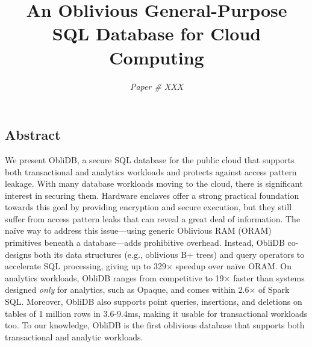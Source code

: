 \documentclass[letterpaper,twocolumn,10pt]{article}
\newcommand{\ignore}[1]{}
\def\name/{ObliDB}
\begin{document}
\date{\vspace{-0.9cm}}

\setlength{\droptitle}{-1.1cm}

\title{\Large \bf An Oblivious General-Purpose SQL Database for Cloud Computing\vspace{-0.1cm}}

\author{\emph{Paper \# XXX}}

\ignore{
\author{
{\rm Your N.\ Here}\\
Your Institution
\and
{\rm Second Name}\\
Second Institution
} %
}
\maketitle



\subsection*{Abstract}
We present \name/, a secure SQL database for the public cloud that supports both transactional and analytics workloads and protects against access pattern leakage.
With many database workloads moving to the cloud, there is significant interest in securing them.
Hardware enclaves offer a strong practical foundation towards this goal by providing encryption and secure execution, but they still suffer from access pattern leaks that can reveal a great deal of information.
The na\"ive way to address this issue---using generic Oblivious RAM (ORAM) primitives beneath a database---adds prohibitive overhead.
Instead, \name/ co-designs both its data structures (e.g., oblivious B+ trees) and query operators to accelerate SQL processing, giving up to 329$\times$ speedup over na\"ive ORAM.
On analytics workloads, \name/ ranges from competitive to 19$\times$ faster than systems designed \emph{only} for analytics, such as Opaque, and comes within 2.6$\times$ of Spark SQL.
Moreover, \name/ also supports point queries, insertions, and deletions on tables of 1 million rows in 3.6-9.4ms, making it usable for transactional workloads too. To our knowledge, \name/ is the first oblivious database that supports both transactional and analytic workloads. 
\end{document}
